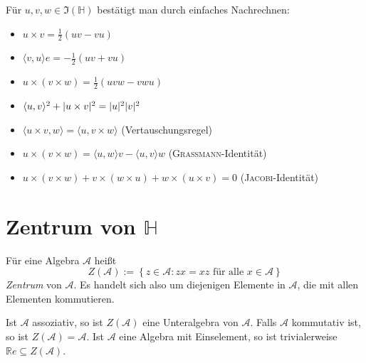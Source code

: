 \documentclass[aspectratio=169]{beamer}
\newcommand{\Ham}{\ensuremath{\mathbb{H}}{ }}
\newcommand{\R}{\ensuremath{\mathbb{R}}{ }}
\DeclarePairedDelimiter\abs{\lvert}{\rvert}
\begin{document}
    \begin{frame}
        Für \(u, v, w \in \Im(\Ham)\) bestätigt man durch einfaches Nachrechnen:
        \begin{itemize}
            \item
                \(u \times v = \frac{1}{2} (uv - vu)\)

            \item
                \(\langle v, u \rangle e = - \frac{1}{2} (uv + vu)\)

            \item
                \(u \times (v \times w) = \frac{1}{2} (uvw - vwu)\)

            \item
                \(\langle u, v \rangle^2 + \abs{u \times v}^2 = \abs{u}^2 \abs{v}^2\)

            \item
                \(\langle u \times v, w \rangle = \langle u, v \times w \rangle\) \hfill (Vertauschungsregel)

            \item
                \(u \times (v \times w) = \langle u, w \rangle v - \langle u, v \rangle w\) \hfill (\textsc{Grassmann}-Identität)

            \item
                \(u \times (v \times w) + v \times (w \times u) + w \times (u \times v) = 0\) \hfill (\textsc{Jacobi}-Identität)
        \end{itemize}
    \end{frame}

    \section{Zentrum von \(\mathbb{H}\)}
    \begin{frame}
        \begin{definition}
            Für eine Algebra \(\mathcal{A}\) heißt
            \[
                Z(\mathcal{A}) := \left\{ z \in \mathcal{A} \colon zx = xz \text{ für alle } x \in \mathcal{A} \right\}
            \] 
            \emph{Zentrum} von \(\mathcal{A}\).
            Es handelt sich also um diejenigen Elemente in \(\mathcal{A}\), die mit allen Elementen kommutieren.

            Ist \(\mathcal{A}\) assoziativ, so ist \(Z(\mathcal{A})\) eine Unteralgebra von \(\mathcal{A}\).
            Falls \(\mathcal{A}\) kommutativ ist, so ist \(Z(\mathcal{A}) = \mathcal{A}\).
            Ist \(\mathcal{A}\) eine Algebra mit Einselement, so ist trivialerweise \(\R e \subseteq Z(\mathcal{A})\).
        \end{definition}
    \end{frame}
\end{document}
